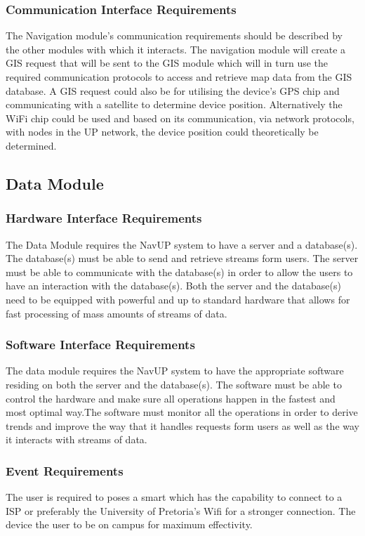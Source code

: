 \documentclass[11pt]{article}
\begin{document}
 \subsubsection{Communication Interface Requirements}
  
The Navigation module’s communication requirements should be described by the other modules with which it interacts. The navigation module will create a GIS request that will be sent to the GIS module which will in turn use the required communication protocols to access and retrieve map data from the GIS database. A GIS request could also be for utilising the device’s GPS chip and communicating with a satellite to determine device position. Alternatively the WiFi chip could be used and based on its communication, via network protocols, with nodes in the UP network, the device position could theoretically be determined.

\subsection{Data Module}

\subsubsection{Hardware Interface Requirements}

The Data Module requires the NavUP system to have a server and a database(s). The database(s) must be able to send and retrieve streams form users. The server must be able to communicate with the database(s) in order to allow the users to have an interaction with the database(s).
Both the server and the database(s) need to be equipped with powerful and up to standard hardware that allows for fast processing of mass amounts of streams of data.

\subsubsection{Software Interface Requirements}

The data module requires the NavUP system to have the appropriate software residing on both the server and the database(s). The software must be able to control the hardware and make sure all operations happen in the fastest and most optimal way.The software must monitor all the operations in order to derive trends and improve the way that it handles requests form users as well as the way it interacts with streams of data.

\subsubsection{Event Requirements}

The user is required to poses a smart which has the capability to connect to a ISP or preferably the University of Pretoria’s Wifi for a stronger connection. The device the user to be on campus for maximum effectivity.
\end{document}
